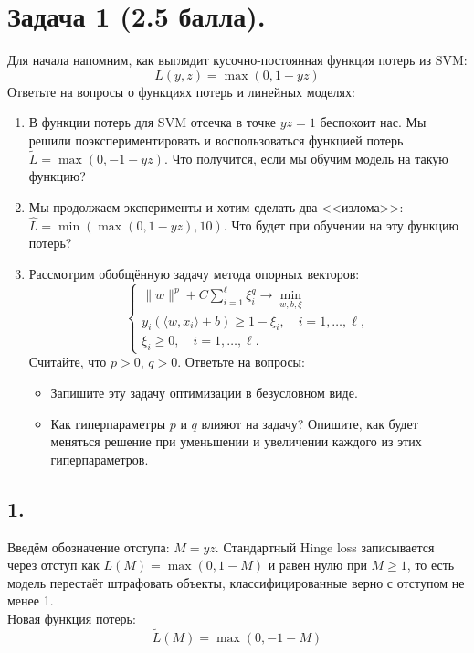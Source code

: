 \documentclass[12pt,a4paper]{article}
\begin{document}
\section*{Задача 1 (2.5 балла).}
Для начала напомним, как выглядит кусочно-постоянная функция потерь из SVM:
\[
L(y,z) = \max(0, 1-yz)
\]
Ответьте на вопросы о функциях потерь и линейных моделях:

\begin{enumerate}
\item В функции потерь для SVM отсечка в точке $yz=1$ беспокоит нас. Мы решили поэкспериментировать и воспользоваться функцией потерь $\tilde{L} = \max(0, -1 - yz)$. Что получится, если мы обучим модель на такую функцию?

\item Мы продолжаем эксперименты и хотим сделать два <<излома>>: $\hat{L} = \min(\max(0, 1-yz), 10)$. Что будет при обучении на эту функцию потерь?

\item Рассмотрим обобщённую задачу метода опорных векторов:
\begin{equation}
\begin{cases}
\|w\|^p + C\displaystyle\sum_{i=1}^{\ell}\xi_i^q \to \min_{w,b,\xi} \\[6pt]
y_i(\langle w, x_i\rangle + b) \geqslant 1 - \xi_i, \quad i=1,\ldots,\ell, \\[4pt]
\xi_i \geqslant 0, \quad i=1,\ldots,\ell.
\end{cases}
\tag{0.1}
\end{equation}
Считайте, что $p>0$, $q>0$. Ответьте на вопросы:
\begin{itemize}
\item Запишите эту задачу оптимизации в безусловном виде.
\item Как гиперпараметры $p$ и $q$ влияют на задачу? Опишите, как будет меняться решение при уменьшении и увеличении каждого из этих гиперпараметров.
\end{itemize}
\end{enumerate}

\subsection*{1.}

Введём обозначение отступа: $M = yz$. Стандартный Hinge loss записывается через отступ как $L(M) = \max(0, 1 - M)$ и равен нулю при $M \geqslant 1$, то есть модель перестаёт штрафовать объекты, классифицированные верно с отступом не менее 1.\\[1mm]
Новая функция потерь:
\[
\tilde{L}(M) = \max(0, -1 - M)
\]
\end{document}
